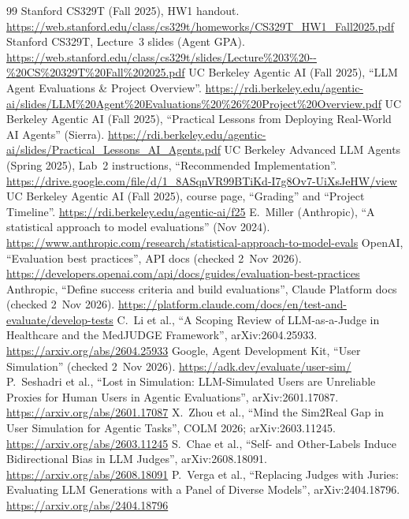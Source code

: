 \documentclass[10pt]{article}
\begin{document}
\begin{thebibliography}{99}
 Stanford CS329T (Fall 2025), HW1 handout. \url{https://web.stanford.edu/class/cs329t/homeworks/CS329T_HW1_Fall2025.pdf}
 Stanford CS329T, Lecture~3 slides (Agent GPA). \url{https://web.stanford.edu/class/cs329t/slides/Lecture\%203\%20--\%20CS\%20329T\%20Fall\%202025.pdf}
 UC Berkeley Agentic AI (Fall 2025), ``LLM Agent Evaluations \& Project Overview''. \url{https://rdi.berkeley.edu/agentic-ai/slides/LLM\%20Agent\%20Evaluations\%20\%26\%20Project\%20Overview.pdf}
 UC Berkeley Agentic AI (Fall 2025), ``Practical Lessons from Deploying Real-World AI Agents'' (Sierra). \url{https://rdi.berkeley.edu/agentic-ai/slides/Practical_Lessons_AI_Agents.pdf}
 UC Berkeley Advanced LLM Agents (Spring 2025), Lab~2 instructions, ``Recommended Implementation''. \url{https://drive.google.com/file/d/1_8ASqnVR99BTiKd-I7g8Ov7-UiXsJeHW/view}
 UC Berkeley Agentic AI (Fall 2025), course page, ``Grading'' and ``Project Timeline''. \url{https://rdi.berkeley.edu/agentic-ai/f25}
 E.~Miller (Anthropic), ``A statistical approach to model evaluations'' (Nov 2024). \url{https://www.anthropic.com/research/statistical-approach-to-model-evals}
 OpenAI, ``Evaluation best practices'', API docs (checked 2~Nov 2026). \url{https://developers.openai.com/api/docs/guides/evaluation-best-practices}
 Anthropic, ``Define success criteria and build evaluations'', Claude Platform docs (checked 2~Nov 2026). \url{https://platform.claude.com/docs/en/test-and-evaluate/develop-tests}
 C.~Li et al., ``A Scoping Review of LLM-as-a-Judge in Healthcare and the MedJUDGE Framework'', arXiv:2604.25933. \url{https://arxiv.org/abs/2604.25933}
 Google, Agent Development Kit, ``User Simulation'' (checked 2~Nov 2026). \url{https://adk.dev/evaluate/user-sim/}
 P.~Seshadri et al., ``Lost in Simulation: LLM-Simulated Users are Unreliable Proxies for Human Users in Agentic Evaluations'', arXiv:2601.17087. \url{https://arxiv.org/abs/2601.17087}
 X.~Zhou et al., ``Mind the Sim2Real Gap in User Simulation for Agentic Tasks'', COLM 2026; arXiv:2603.11245. \url{https://arxiv.org/abs/2603.11245}
 S.~Chae et al., ``Self- and Other-Labels Induce Bidirectional Bias in LLM Judges'', arXiv:2608.18091. \url{https://arxiv.org/abs/2608.18091}
 P.~Verga et al., ``Replacing Judges with Juries: Evaluating LLM Generations with a Panel of Diverse Models'', arXiv:2404.18796. \url{https://arxiv.org/abs/2404.18796}

\end{thebibliography}
\end{document}
